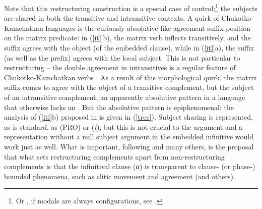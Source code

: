 \documentclass[output=paper]{langsci/langscibook}
\begin{document}
Note that this restructuring construction is a special case of
control;\footnote{Or , if modals are always  configurations, see
\citet{wurmbrand99}.} the subjects are shared in both the transitive and
intransitive contexts. A quirk of Chu\-kotko-Kamchatkan languages is the
curiously absolutive-like agreement suffix position on the matrix predicate: in
(\ref{itl}b), the matrix verb inflects transitively, and the suffix agrees with
the object (of the embedded clause), while in (\ref{itl}a), the suffix (as well
as the prefix) agrees with the local subject. This is not particular to
restructuring -- the double agreement in intransitives is a regular feature of
Chukotko-Kamchatkan verbs \citep{bobaljik98}. As a result of this morphological
quirk, the matrix suffix comes to agree with the object of a transitive
complement, but the subject of an intransitive complement, an apparently
absolutive pattern in a language that otherwise lacks an .
But the absolutive pattern is epiphenomenal: the analysis of (\ref{itl}b)
proposed in \citet{BobWur2005} is given in (\ref{tree}). Subject sharing is
represented, as is standard, as  (PRO) or  (\emph{t}), but this
is not crucial to the argument and a representation without a null
subject
argument in the embedded infinitive would work just as well. What is important,
following \citet{Wurmbrand2001,wurmbrand15} and many others, is the proposal that
what sets restructuring complements apart from non-restructuring complements is
that the infinitival clause (α) is transparent to clause- (or phase-)
bounded phenomena, such as clitic movement and agreement (and others).

\ea \label{tree}
\z
\end{document}
